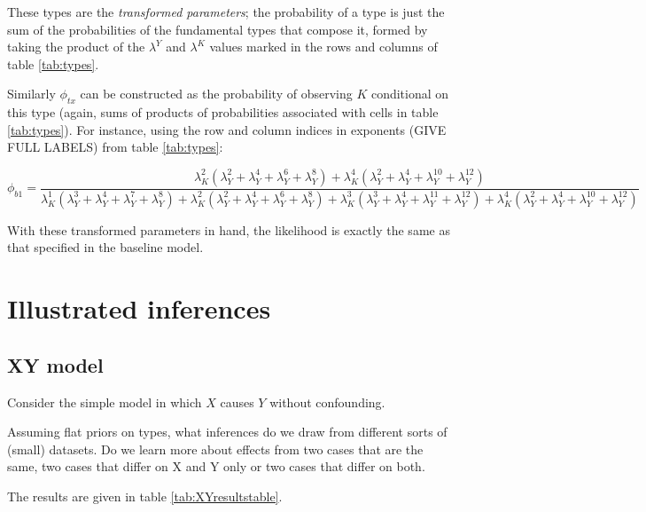 \documentclass[
  12pt,
]{book}
\begin{document}
These types are the \emph{transformed parameters}; the probability of a type is just the sum of the probabilities of the fundamental types that compose it, formed by taking the product of the \(\lambda^Y\) and \(\lambda^K\) values marked in the rows and columns of table \ref{tab:types}.

Similarly \(\phi_{tx}\) can be constructed as the probability of observing \(K\) conditional on this type (again, sums of products of probabilities associated with cells in table \ref{tab:types}). For instance, using the row and column indices in exponents (GIVE FULL LABELS) from table \ref{tab:types}:

\[\phi_{b1}=\frac{\lambda_K^2(\lambda_Y^2+\lambda_Y^4+\lambda_Y^6+\lambda_Y^8)+\lambda_K^4(\lambda_Y^2+\lambda_Y^4+\lambda_Y^{10}+\lambda_Y^{12})}{
\lambda_K^1(\lambda_Y^3+\lambda_Y^4+\lambda_Y^7+\lambda_Y^8)+\lambda_K^2(\lambda_Y^2+\lambda_Y^4+\lambda_Y^6+\lambda_Y^8)+\lambda_K^3(\lambda_Y^3+\lambda_Y^4+\lambda_Y^11+\lambda_Y^{12})+\lambda_K^4(\lambda_Y^2+\lambda_Y^4+\lambda_Y^{10}+\lambda_Y^{12})}\]

With these transformed parameters in hand, the likelihood is exactly the same as that specified in the baseline model.

\hypertarget{illustrated-inferences}{%
\section{Illustrated inferences}\label{illustrated-inferences}}

\hypertarget{xy-model}{%
\subsection{XY model}\label{xy-model}}

Consider the simple model in which \(X\) causes \(Y\) without confounding.

Assuming flat priors on types, what inferences do we draw from different sorts of (small) datasets. Do we learn more about effects from two cases that are the same, two cases that differ on X and Y only or two cases that differ on both.

The results are given in table \ref{tab:XYresultstable}.
\end{document}
